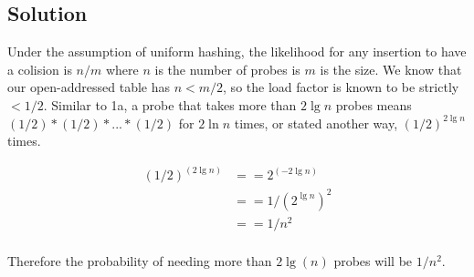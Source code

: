 \subsection*{Solution}

Under the assumption of uniform hashing, the likelihood for any insertion to have a colision is $n/m$ where $n$ is the number of probes is $m$ is the size. We know that our open-addressed table has $n < m/2$, so the load factor is known to be strictly $< 1/2$. Similar to 1a, a probe that takes more than $2 \lg n$ probes means $(1/2) * (1/2) * ... * (1/2)$ for $2 \ln n$ times, or stated another way, $(1/2)^{2 \lg n}$ times.

\begin{align*}
(1/2)^{(2 \lg n)} &== 2^{(-2 \lg n)} \\
                 &== 1/{(2^{\lg n})^2} \\
                 &== 1/n^2 \\
\end{align*}

Therefore the probability of needing more than $2 \lg(n)$ probes will be $1/n^2$.
